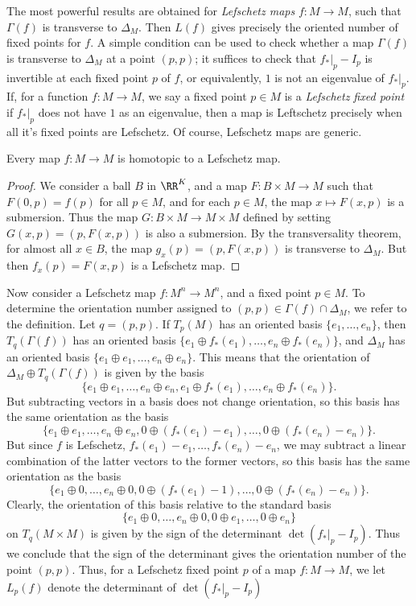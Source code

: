 The most powerful results are obtained for \emph{Lefschetz maps} $f: M \to M$, such that $\Gamma(f)$ is transverse to $\Delta_M$. Then $L(f)$ gives precisely the oriented number of fixed points for $f$. A simple condition can be used to check whether a map $\Gamma(f)$ is transverse to $\Delta_M$ at a point $(p,p)$; it suffices to check that $f_*|_p - I_p$ is invertible at each fixed point $p$ of $f$, or equivalently, $1$ is not an eigenvalue of $f_*|_p$. If, for a function $f: M \to M$, we say a fixed point $p \in M$ is a \emph{Lefschetz fixed point} if $f_*|_p$ does not have $1$ as an eigenvalue, then a map is Leftschetz precisely when all it's fixed points are Lefschetz. Of course, Lefschetz maps are generic.

\begin{lemma}
    Every map $f: M \to M$ is homotopic to a Lefschetz map.
\end{lemma}
\begin{proof}
    We consider a ball $B$ in $\RR^K$, and a map $F: B \times M \to M$ such that $F(0,p) = f(p)$ for all $p \in M$, and for each $p \in M$, the map $x \mapsto F(x,p)$ is a submersion. Thus the map $G: B \times M \to M \times M$ defined by setting $G(x,p) = (p,F(x,p))$ is also a submersion. By the transversality theorem, for almost all $x \in B$, the map $g_x(p) = (p,F(x,p))$ is transverse to $\Delta_M$. But then $f_x(p) = F(x,p)$ is a Lefschetz map.
\end{proof}

Now consider a Lefschetz map $f: M^n \to M^n$, and a fixed point $p \in M$. To determine the orientation number assigned to $(p,p) \in \Gamma(f) \cap \Delta_M$, we refer to the definition. Let $q = (p,p)$. If $T_p(M)$ has an oriented basis $\{ e_1, \dots, e_n \}$, then $T_q(\Gamma(f))$ has an oriented basis $\{ e_1 \oplus f_*(e_1), \dots, e_n \oplus f_*(e_n) \}$, and $\Delta_M$ has an oriented basis $\{ e_1 \oplus e_1, \dots, e_n \oplus e_n \}$. This means that the orientation of $\Delta_M \oplus T_q(\Gamma(f))$ is given by the basis
%
\[ \{  e_1 \oplus e_1, \dots, e_n \oplus e_n, e_1 \oplus f_*(e_1), \dots, e_n \oplus f_*(e_n) \}. \]
%
But subtracting vectors in a basis does not change orientation, so this basis has the same orientation as the basis
%
\[ \{  e_1 \oplus e_1, \dots, e_n \oplus e_n, 0 \oplus (f_*(e_1) - e_1), \dots, 0 \oplus (f_*(e_n) - e_n) \}. \]
%
But since $f$ is Lefschetz, $f_*(e_1) - e_1, \dots, f_*(e_n) - e_n$, we may subtract a linear combination of the latter vectors to the former vectors, so this basis has the same orientation as the basis
%
\[ \{ e_1 \oplus 0, \dots, e_n \oplus 0, 0 \oplus (f_*(e_1) - 1), \dots, 0 \oplus (f_*(e_n) - e_n) \}. \]
%
Clearly, the orientation of this basis relative to the standard basis
%
\[ \{ e_1 \oplus 0, \dots, e_n \oplus 0, 0 \oplus e_1, \dots, 0 \oplus e_n \} \]
%
on $T_q(M \times M)$ is given by the sign of the determinant $\det(f_*|_p - I_p)$. Thus we conclude that the sign of the determinant gives the orientation number of the point $(p,p)$. Thus, for a Lefschetz fixed point $p$ of a map $f: M \to M$, we let $L_p(f)$ denote the determinant of $\det(f_*|_p - I_p)$

